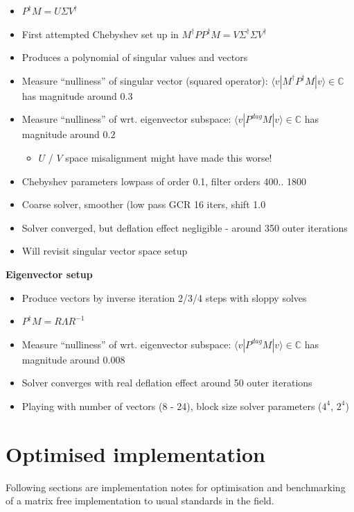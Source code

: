 \documentclass[letter,10pt]{report}
\begin{document}
\begin{itemize}
\item $P^\dagger M = U \Sigma V^\dagger$
\item First attempted Chebyshev set up in $M^\dagger P P^\dagger M = V \Sigma^\dagger \Sigma V^\dagger$
\item Produces a polynomial of singular values and vectors  
\item Measure ``nulliness'' of singular vector (squared operator): $\langle v | M^\dagger P^{\dagger} M | v \rangle \in \mathbb{C} $  has magnitude around $0.3$
\item Measure ``nulliness'' of wrt. eigenvector subspace: $\langle v | P^{dag} M | v \rangle \in \mathbb{C} $ has magnitude around $0.2$
  \begin{itemize}
  \item $U$ / $V$ space misalignment might have made this worse!
  \end{itemize}
\item Chebyshev parameters lowpass of order 0.1, filter orders 400.. 1800
\item Coarse solver, smoother (low pass GCR 16 iters, shift 1.0
\item Solver converged, but deflation effect negligible - around 350 outer iterations
\item Will revisit singular vector space setup
\end{itemize}
  
{\bf Eigenvector setup }
\begin{itemize}
\item Produce vectors by inverse iteration 2/3/4 steps with sloppy solves
\item $P^\dagger M = R \Lambda R^{-1}$
\item Measure ``nulliness'' of wrt. eigenvector subspace: $\langle v | P^{dag} M | v \rangle \in \mathbb{C} $ has magnitude around $0.008$
\item Solver converges with real deflation effect around 50 outer iterations
\item Playing with number of vectors (8 - 24), block size solver parameters ($4^4$, $2^4$)
\end{itemize}


\section{Optimised implementation}

Following sections are implementation notes for optimisation and benchmarking of a matrix free implementation to usual
standards in the field.
\end{document}

